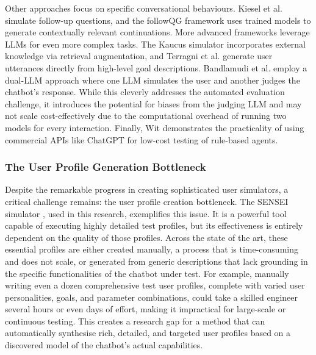 Other approaches focus on specific conversational behaviours.
Kiesel et al. \autocite{kieselSimulatingFollowUpQuestions2024}
simulate follow-up questions,
and the followQG framework \autocite{bImprovingAsynchronousInterview2021}
uses trained models to generate contextually relevant continuations.
More advanced frameworks leverage \acp{LLM} for even more complex tasks.
The Kaucus simulator \autocite{dholeKAUCUSKnowledgeAugmented2024}
incorporates external knowledge via retrieval augmentation,
and Terragni et al. \autocite{terragniInContextLearningUser2023}
generate user utterances directly from high-level goal descriptions.
Bandlamudi et al. \autocite{bandlamudiFrameworkEnableTest2024}
employ a dual-\ac{LLM} approach where
one \ac{LLM} simulates the user and
another judges the chatbot's response.
While this cleverly addresses the automated evaluation challenge,
it introduces the potential for biases from the judging LLM
and may not scale cost-effectively due to the computational overhead
of running two models for every interaction.
Finally, Wit \autocite{dewitLeveragingLargeLanguage2024}
demonstrates the practicality of using commercial APIs like ChatGPT
for low-cost testing of rule-based agents.

\subsubsection{The User Profile Generation Bottleneck}
Despite the remarkable progress in creating sophisticated user simulators,
a critical challenge remains:
the user profile creation bottleneck.
The SENSEI simulator \autocite{delaraAutomatedEndtoEndTesting2025, delaraSensei},
used in this research, exemplifies this issue.
It is a powerful tool capable of executing highly detailed test profiles,
but its effectiveness is entirely dependent on the quality of those profiles.
Across the state of the art,
these essential profiles are either created manually,
a process that is time-consuming and does not scale,
or generated from generic descriptions
that lack grounding in the specific functionalities of the chatbot under test.
For example, manually writing even a dozen comprehensive test user profiles,
complete with varied user personalities, goals, and parameter combinations,
could take a skilled engineer several hours or even days of effort,
making it impractical for large-scale or continuous testing.
This creates a research gap
for a method that can automatically synthesise
rich, detailed, and targeted user profiles
based on a discovered model of the chatbot's actual capabilities.

